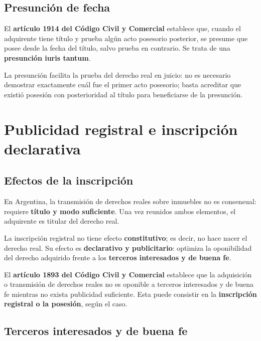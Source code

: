 \documentclass[12pt,oneside]{book}
\begin{document}
\section{Presunción de fecha}

\begin{important}
El \textbf{artículo 1914 del Código Civil y Comercial} establece que, cuando el adquirente tiene título y prueba algún acto posesorio posterior, se presume que posee desde la fecha del título, salvo prueba en contrario. Se trata de una \textbf{presunción iuris tantum}.
\end{important}

La presunción facilita la prueba del derecho real en juicio: no es necesario demostrar exactamente cuál fue el primer acto posesorio; basta acreditar que existió posesión con posterioridad al título para beneficiarse de la presunción.

\chapter{Publicidad registral e inscripción declarativa}

\section{Efectos de la inscripción}

En Argentina, la transmisión de derechos reales sobre inmuebles no es consensual: requiere \textbf{título y modo suficiente}. Una vez reunidos ambos elementos, el adquirente es titular del derecho real.

La inscripción registral no tiene efecto \textbf{constitutivo}; es decir, no hace nacer el derecho real. Su efecto es \textbf{declarativo y publicitario}: optimiza la oponibilidad del derecho adquirido frente a los \textbf{terceros interesados y de buena fe}.

\begin{important}
El \textbf{artículo 1893 del Código Civil y Comercial} establece que la adquisición o transmisión de derechos reales no es oponible a terceros interesados y de buena fe mientras no exista publicidad suficiente. Esta puede consistir en la \textbf{inscripción registral o la posesión}, según el caso.
\end{important}

\section{Terceros interesados y de buena fe}
\end{document}
